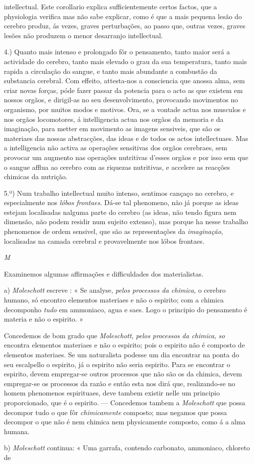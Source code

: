 intellectual. Este corollario explica sufficientemente certos factos, que a physiologia verifica mas não sabe explicar, como é que a mais pequena lesão do cerebro produz, ás vezes, graves perturbações, ao passo que, outras vezes, graves lesões não produzem o menor desarranjo intellectual.\par 4.) Quanto mais intenso e prolongado fôr o pensamento, tanto maior será a actividade do cerebro, tanto mais elevado o grau da sua temperatura, tanto mais rapida a circulação do sangue, e tanto mais abundante a combustão da substancia cerebral. Com effeito, attesta-nos a consciencia que anossa alma, sem criar novas forças, póde fazer passar da potencia para o acto as que existem em nossos orgãos, e dirigil-as no seu desenvolvimento, provocando movimentos no organismo, por muitos modos e motivos. Ora, se a vontade actua nos musculos e nos orgãos locomotores, á intelligencia actua nos orgãos da memoria e da imaginação, para metter em movimento as imagens sensiveis, que são os materiaes das nossas abstracções, das ideas e de todos os actos intellectuaes. Mas a intelligencia não activa as operações sensitivas dos orgãos cerebraes, sem provocar um augmento nas operações nutritivas d'esses orgãos e por isso sem que o sangue afflua ao cerebro com as riquezas nutritivas, e accelere as reacções chimicas da nutrição.\par 5.º) Num trabalho intellectual muito intenso, sentimos cançaço no cerebro, e especialmente nos \emph{lóbos frontaes}. Dá-se tal phenomeno, não já porque as ideas estejam localisadas nalguma parte do cerebro (as ideas, não tendo figura nem dimensão, não podem residir num sujeito extenso), mas porque ha nesse trabalho phenomenos de ordem sensivel, que são as representações da \emph{imaginação}, localisadas na camada cerebral e provavelmente nos lóbos frontaes.\par \emph{M}\par Examinemos algumas affirmações e difficuldades dos materialistas.\par a) \emph{Moleschott} escreve : « Se analyse, \emph{pelos processos da chimica}, o cerebro humano, só encontro elementos materiaes e não o espirito; com a chimica decomponho \emph{tudo} em ammoniaco, agua e saes. Logo o principio do pensamento é materia e não o espirito. »\par Concedemos de bom grado que \emph{Moleschott}, \emph{pelos processos da chimica}, \emph{so} encontra elementos materiaes e não o espirito; pois o espirito não é composto de elementos materiaes. Se um naturalista podesse um dia encontrar na ponta do seu escalpello o espirito, já o espirito não seria espirito. Para se encontrar o espirito, devem empregar-se outros processos que não são os da chimica, devem empregar-se os processos da razão e então esta nos dirá que, realizando-se no homem phenomenos espirituaes, deve tambem existir nelle um principio proporcionado, que é o espirito. --- Concedemos tambem a \emph{Moleschott} que possa decompor tudo o que fôr \emph{chimicamente} composto; mas negamos que possa decompor o que não é nem chimica nem physicamente composto, como á a alma humana.\par b) \emph{Moleschott} continua: « Uma garrafa, contendo carbonato, ammoniaco, chloreto de 